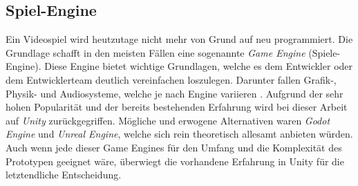 \subsection{Spiel-Engine}
Ein Videospiel wird heutzutage nicht mehr von Grund auf neu programmiert. Die Grundlage schafft in den meisten Fällen eine sogenannte \textit{Game Engine} (Spiele-Engine). Diese Engine bietet wichtige Grundlagen, welche es dem Entwickler oder dem Entwicklerteam deutlich vereinfachen loszulegen. Darunter fallen Grafik-, Physik- und Audiosysteme, welche je nach Engine variieren \cite*[]{whygameengine}. Aufgrund der sehr hohen Popularität \cite*[]{mostusedengines} und der bereits bestehenden Erfahrung wird bei dieser Arbeit auf \textit{Unity}\cite*[]{unity} zurückgegriffen. Mögliche und erwogene Alternativen waren \textit{Godot Engine} und \textit{Unreal Engine}, welche sich rein theoretisch allesamt anbieten würden. Auch wenn jede dieser Game Engines für den Umfang und die Komplexität des Prototypen geeignet wäre, überwiegt die vorhandene Erfahrung in Unity für die letztendliche Entscheidung.